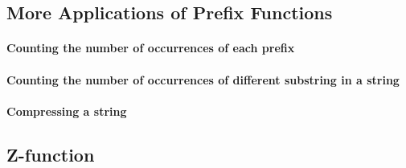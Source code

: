 \documentclass[../main.tex]{subfiles}
\begin{document}
\subsection{More Applications of Prefix Functions}


\paragraph{Counting the number of occurrences of each prefix}

\paragraph{Counting the number of occurrences of different substring in a string}

\paragraph{Compressing a string}



\subsection{Z-function} 
\end{document}
